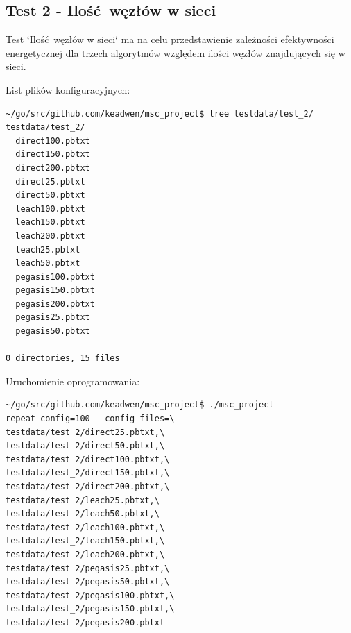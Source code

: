 \documentclass[a4paper,12pt,twoside,openany]{report}
\begin{document}
\subsection{Test 2 - Ilość węzłów w sieci}

Test `Ilość węzłów w sieci` ma na celu przedstawienie zależności efektywności energetycznej dla trzech algorytmów względem ilości węzłów znajdujących się w sieci.

List plików konfiguracyjnych:

\begin{lstlisting}
~/go/src/github.com/keadwen/msc_project$ tree testdata/test_2/
testdata/test_2/
  direct100.pbtxt
  direct150.pbtxt
  direct200.pbtxt
  direct25.pbtxt
  direct50.pbtxt
  leach100.pbtxt
  leach150.pbtxt
  leach200.pbtxt
  leach25.pbtxt
  leach50.pbtxt
  pegasis100.pbtxt
  pegasis150.pbtxt
  pegasis200.pbtxt
  pegasis25.pbtxt
  pegasis50.pbtxt

0 directories, 15 files
\end{lstlisting}

Uruchomienie oprogramowania:

\begin{lstlisting}
~/go/src/github.com/keadwen/msc_project$ ./msc_project --repeat_config=100 --config_files=\
testdata/test_2/direct25.pbtxt,\
testdata/test_2/direct50.pbtxt,\
testdata/test_2/direct100.pbtxt,\
testdata/test_2/direct150.pbtxt,\
testdata/test_2/direct200.pbtxt,\
testdata/test_2/leach25.pbtxt,\
testdata/test_2/leach50.pbtxt,\
testdata/test_2/leach100.pbtxt,\
testdata/test_2/leach150.pbtxt,\
testdata/test_2/leach200.pbtxt,\
testdata/test_2/pegasis25.pbtxt,\
testdata/test_2/pegasis50.pbtxt,\
testdata/test_2/pegasis100.pbtxt,\
testdata/test_2/pegasis150.pbtxt,\
testdata/test_2/pegasis200.pbtxt
\end{lstlisting}
\end{document}
